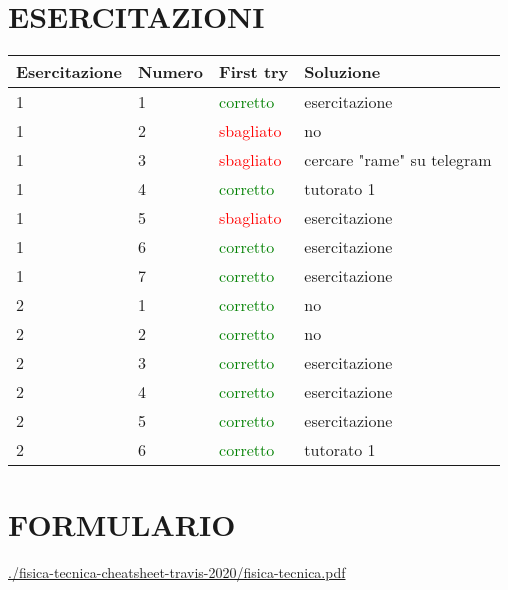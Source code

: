\documentclass[a4paper, 9pt]{article}
\begin{document}
    \section{ESERCITAZIONI}
    \begin{tabular}{llll}
        \textbf{Esercitazione} & \textbf{Numero} & \textbf{First try} & \textbf{Soluzione}\\
        \hline
        1 & 1 & \textcolor{green}{corretto} & esercitazione\\
        1 & 2 & \textcolor{red}{sbagliato} & no\\
        1 & 3 & \textcolor{red}{sbagliato} & cercare "rame" su telegram\\
        1 & 4 & \textcolor{green}{corretto} & tutorato 1\\
        1 & 5 & \textcolor{red}{sbagliato} & esercitazione\\
        1 & 6 & \textcolor{green}{corretto} & esercitazione\\
        1 & 7 & \textcolor{green}{corretto} & esercitazione\\
        \hline
        2 & 1 & \textcolor{green}{corretto} & no\\
        2 & 2 & \textcolor{green}{corretto} & no\\
        2 & 3 & \textcolor{green}{corretto} & esercitazione\\
        2 & 4 & \textcolor{green}{corretto} & esercitazione\\ 
        2 & 5 & \textcolor{green}{corretto} & esercitazione\\
        2 & 6 & \textcolor{green}{corretto} & tutorato 1\\
    \end{tabular}
    \section{FORMULARIO}
    \url{./fisica-tecnica-cheatsheet-travis-2020/fisica-tecnica.pdf}
\end{document}
